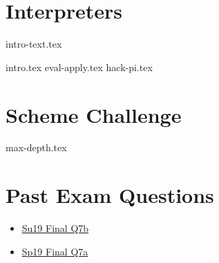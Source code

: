 \documentclass{exam}
\begin{document}
\newpage
\section{Interpreters}
{intro-text.tex}
\begin{questions}
    {intro.tex}
    {eval-apply.tex}
\newpage
    {hack-pi.tex}
\end{questions}

\section{Scheme Challenge}
\begin{questions}
{max-depth.tex}
\end{questions}

\newpage
\section{Past Exam Questions}
\begin{itemize}
    \item \href{https://cs61a.org/exam/su19/final/61a-su19-final.pdf#page=10}{Su19 Final Q7b}
    \item \href{https://cs61a.org/exam/sp19/final/61a-sp19-final.pdf#page=8}{Sp19 Final Q7a}
\end{itemize}

\end{document}
